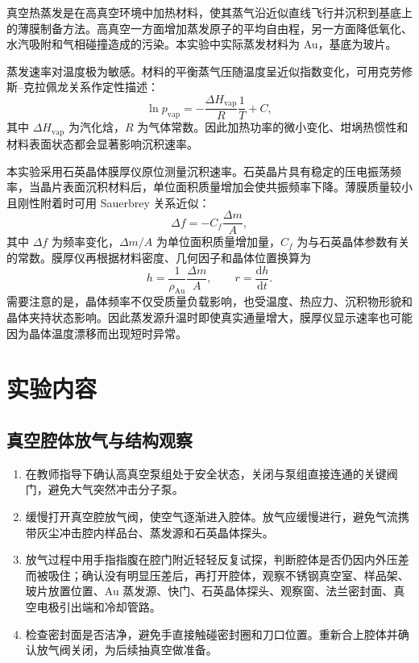 \documentclass[11pt]{article}
\begin{document}
真空热蒸发是在高真空环境中加热材料，使其蒸气沿近似直线飞行并沉积到基底上的薄膜制备方法。高真空一方面增加蒸发原子的平均自由程，另一方面降低氧化、水汽吸附和气相碰撞造成的污染。本实验中实际蒸发材料为 Au，基底为玻片。

蒸发速率对温度极为敏感。材料的平衡蒸气压随温度呈近似指数变化，可用克劳修斯--克拉佩龙关系作定性描述：
\begin{equation}
    \ln p_{\mathrm{vap}} = -\frac{\Delta H_{\mathrm{vap}}}{R}\frac{1}{T}+C,
    \label{eq:clausius}
\end{equation}
其中 $\Delta H_{\mathrm{vap}}$ 为汽化焓，$R$ 为气体常数。因此加热功率的微小变化、坩埚热惯性和材料表面状态都会显著影响沉积速率。

本实验采用石英晶体膜厚仪原位测量沉积速率。石英晶片具有稳定的压电振荡频率，当晶片表面沉积材料后，单位面积质量增加会使共振频率下降。薄膜质量较小且刚性附着时可用 Sauerbrey 关系近似：
\begin{equation}
    \Delta f = -C_f\frac{\Delta m}{A},
    \label{eq:sauerbrey}
\end{equation}
其中 $\Delta f$ 为频率变化，$\Delta m/A$ 为单位面积质量增加量，$C_f$ 为与石英晶体参数有关的常数。膜厚仪再根据材料密度、几何因子和晶体位置换算为
\begin{equation}
    h=\frac{1}{\rho_{\mathrm{Au}}}\frac{\Delta m}{A},
    \qquad
    r=\frac{\mathrm dh}{\mathrm dt}.
\end{equation}
需要注意的是，晶体频率不仅受质量负载影响，也受温度、热应力、沉积物形貌和晶体夹持状态影响。因此蒸发源升温时即使真实通量增大，膜厚仪显示速率也可能因为晶体温度漂移而出现短时异常。

\section{实验内容}

\subsection{真空腔体放气与结构观察}

\begin{enumerate}
    \item 在教师指导下确认高真空泵组处于安全状态，关闭与泵组直接连通的关键阀门，避免大气突然冲击分子泵。
    \item 缓慢打开真空腔放气阀，使空气逐渐进入腔体。放气应缓慢进行，避免气流携带灰尘冲击腔内样品台、蒸发源和石英晶体探头。
    \item 放气过程中用手指指腹在腔门附近轻轻反复试探，判断腔体是否仍因内外压差而被吸住；确认没有明显压差后，再打开腔体，观察不锈钢真空室、样品架、玻片放置位置、Au 蒸发源、快门、石英晶体探头、观察窗、法兰密封面、真空电极引出端和冷却管路。
    \item 检查密封面是否洁净，避免手直接触碰密封圈和刀口位置。重新合上腔体并确认放气阀关闭，为后续抽真空做准备。
\end{enumerate}
\end{document}
